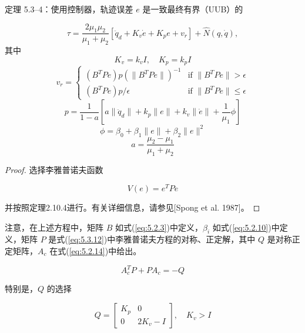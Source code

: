 \documentclass[UTF8,12pt,a4paper]{ctexart}
\begin{document}
\begin{theorem}\label{thm:5.3.4}
定理 5.3--4：使用控制器，轨迹误差 $e$ 是一致最终有界（UUB）的

\begin{equation}
\tau = \frac{2\mu_1\mu_2}{\mu_1+\mu_2}[\ddot{q}_d + K_v\dot{e} + K_p e + v_r] + \hat{N}(q,\dot{q}),
\end{equation}
其中
\begin{equation}
K_v = k_v I, \quad K_p = k_p I
\end{equation}
\begin{equation}
v_r = \begin{cases} (B^T P e)p(\|B^T P e\|)^{-1} & \text{if } \|B^T P e\| > \epsilon \\ (B^T P e)p/\epsilon & \text{if } \|B^T P e\| \leq \epsilon \end{cases}
\end{equation}
\begin{equation}
p = \frac{1}{1-a}\left[a\|\ddot{q}_d\| + k_p\|e\| + k_v\|\dot{e}\| + \frac{1}{\mu_1}\phi\right]
\end{equation}
\begin{equation}
\phi = \beta_0 + \beta_1\|e\| + \beta_2\|e\|^2
\end{equation}
\begin{equation}
a = \frac{\mu_2-\mu_1}{\mu_1+\mu_2}
\end{equation}
\end{theorem}

\begin{proof}
选择李雅普诺夫函数

\begin{equation}
V(e) = e^T P e
\end{equation}

并按照定理2.10.4进行。有关详细信息，请参见[Spong et al. 1987]。
\end{proof}

注意，在上述方程中，矩阵 $B$ 如式(\ref{eq:5.2.3})中定义，$\beta_i$ 如式(\ref{eq:5.2.10})中定义，矩阵 $P$ 是式(\ref{eq:5.3.12})中李雅普诺夫方程的对称、正定解，其中 $Q$ 是对称正定矩阵，$A_c$ 在式(\ref{eq:5.2.14})中给出。

\begin{equation}\label{eq:5.3.12}
A_c^T P + P A_c = -Q
\end{equation}

特别是，$Q$ 的选择

\begin{equation}\label{eq:5.3.13}
Q = \begin{bmatrix} K_p & 0 \\ 0 & 2K_v - I \end{bmatrix}, \quad K_v > I
\end{equation}
\end{document}
